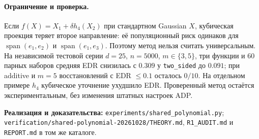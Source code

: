 \documentclass[10pt,a4paper]{article}
\newcommand{\code}[1]{\nolinkurl{#1}}
\begin{document}
\paragraph{Ограничение и проверка.}
Если $f(X)=X_1+\delta h_4(X_2)$ при стандартном Gaussian $X$, кубическая
проекция теряет второе направление: её популяционный риск одинаков для
$\operatorname{span}(e_1,e_2)$ и $\operatorname{span}(e_1,e_3)$. Поэтому
метод нельзя считать универсальным. На независимой тестовой серии
$d=25$, $n=5000$, $m\in\{3,5\}$, три функции и 60 парных наборов средняя
EDR снизилась с $0.309$ у \code{two_sided} до $0.091$; при additive и $m=5$
восстановлений с EDR $\le0.1$ осталось $0/10$. На отдельном примере $h_4$
кубическое уточнение ухудшило EDR. Проверенный метод остаётся
экспериментальным, без изменения штатных настроек ADP.

\smallskip
\textbf{Реализация и доказательства:} \code{experiments/shared_polynomial.py};
\code{verification/shared-polynomial-20261028/THEORY.md},
\code{R1_AUDIT.md} и \code{REPORT.md} в том же каталоге.
\end{document}
